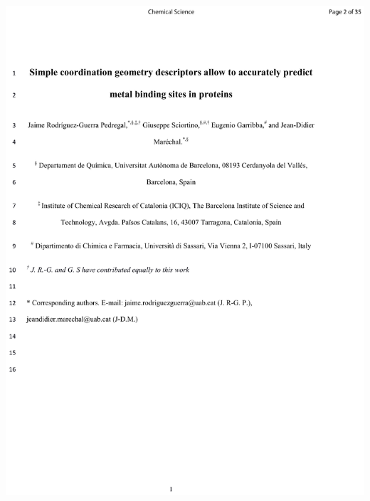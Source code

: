 \includegraphics[width=\textwidth]{figures/pubs/gaudimetals.pdf}
\clearpage\thispagestyle{empty}\mbox{}\clearpage
